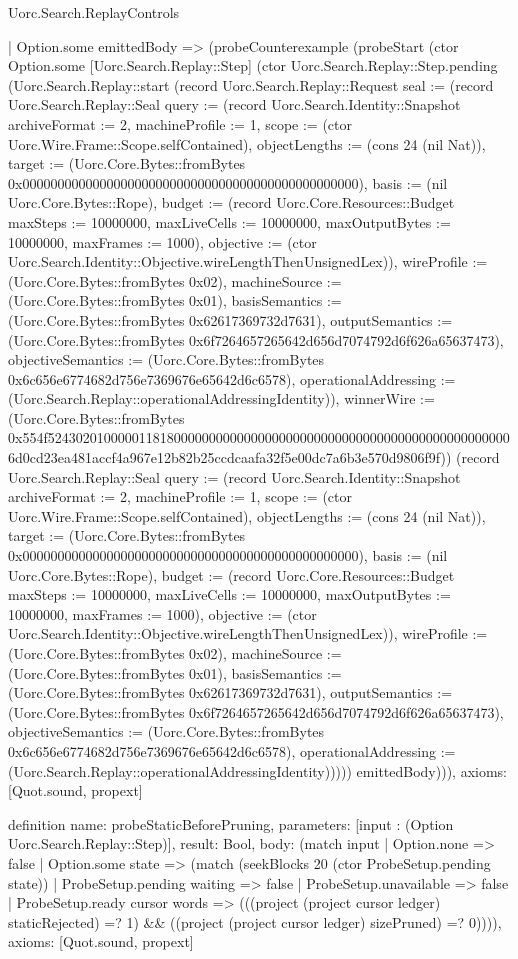\begin{lexlean}{Uorc.Search.ReplayControls}
\begin{semanticmodule}
{    | Option.some emittedBody => (probeCounterexample (probeStart (ctor Option.some [Uorc.Search.Replay::Step] (ctor Uorc.Search.Replay::Step.pending (Uorc.Search.Replay::start (record Uorc.Search.Replay::Request {seal := (record Uorc.Search.Replay::Seal {query := (record Uorc.Search.Identity::Snapshot {archiveFormat := 2, machineProfile := 1, scope := (ctor Uorc.Wire.Frame::Scope.selfContained), objectLengths := (cons 24 (nil Nat)), target := (Uorc.Core.Bytes::fromBytes 0x000000000000000000000000000000000000000000000000), basis := (nil Uorc.Core.Bytes::Rope), budget := (record Uorc.Core.Resources::Budget {maxSteps := 10000000, maxLiveCells := 10000000, maxOutputBytes := 10000000, maxFrames := 1000}), objective := (ctor Uorc.Search.Identity::Objective.wireLengthThenUnsignedLex)}), wireProfile := (Uorc.Core.Bytes::fromBytes 0x02), machineSource := (Uorc.Core.Bytes::fromBytes 0x01), basisSemantics := (Uorc.Core.Bytes::fromBytes 0x62617369732d7631), outputSemantics := (Uorc.Core.Bytes::fromBytes 0x6f7264657265642d656d7074792d6f626a65637473), objectiveSemantics := (Uorc.Core.Bytes::fromBytes 0x6c656e6774682d756e7369676e65642d6c6578), operationalAddressing := (Uorc.Search.Replay::operationalAddressingIdentity)}), winnerWire := (Uorc.Core.Bytes::fromBytes 0x554f5243020100000118180000000000000000000000000000000000000000000000006d0cd23ea481accf4a967e12b82b25ccdcaafa32f5e00dc7a6b3e570d9806f9f)}) (record Uorc.Search.Replay::Seal {query := (record Uorc.Search.Identity::Snapshot {archiveFormat := 2, machineProfile := 1, scope := (ctor Uorc.Wire.Frame::Scope.selfContained), objectLengths := (cons 24 (nil Nat)), target := (Uorc.Core.Bytes::fromBytes 0x000000000000000000000000000000000000000000000000), basis := (nil Uorc.Core.Bytes::Rope), budget := (record Uorc.Core.Resources::Budget {maxSteps := 10000000, maxLiveCells := 10000000, maxOutputBytes := 10000000, maxFrames := 1000}), objective := (ctor Uorc.Search.Identity::Objective.wireLengthThenUnsignedLex)}), wireProfile := (Uorc.Core.Bytes::fromBytes 0x02), machineSource := (Uorc.Core.Bytes::fromBytes 0x01), basisSemantics := (Uorc.Core.Bytes::fromBytes 0x62617369732d7631), outputSemantics := (Uorc.Core.Bytes::fromBytes 0x6f7264657265642d656d7074792d6f626a65637473), objectiveSemantics := (Uorc.Core.Bytes::fromBytes 0x6c656e6774682d756e7369676e65642d6c6578), operationalAddressing := (Uorc.Search.Replay::operationalAddressingIdentity)})))) emittedBody))),
  axioms: [Quot.sound, propext]
}

definition{
  name: probeStaticBeforePruning,
  parameters: [input : (Option Uorc.Search.Replay::Step)],
  result: Bool,
  body: (match input
    | Option.none => false
    | Option.some state => (match (seekBlocks 20 (ctor ProbeSetup.pending state))
      | ProbeSetup.pending waiting => false
      | ProbeSetup.unavailable => false
      | ProbeSetup.ready cursor words => (((project (project cursor ledger) staticRejected) =? 1) && ((project (project cursor ledger) sizePruned) =? 0)))),
  axioms: [Quot.sound, propext]
}


\end{semanticmodule}
\end{lexlean}
